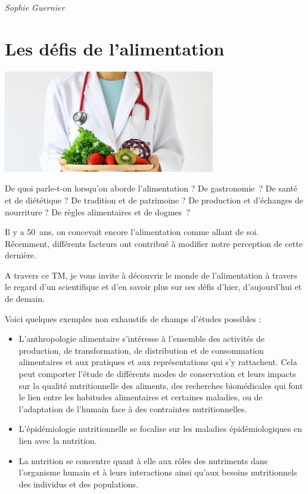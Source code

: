 \documentclass[
  10pt,
  french,
  a5paper,
  openany]{book}
\providecommand{\tightlist}{%
  \setlength{\itemsep}{0pt}\setlength{\parskip}{0pt}}
\newenvironment{signature}{\begin{flushright}}{\end{flushright}}
\begin{document}
\begin{signature}
\emph{Sophie Guernier}

\end{signature}

\hypertarget{les-duxe9fis-de-lalimentation}{%
\chapter{Les défis de l'alimentation}\label{les-duxe9fis-de-lalimentation}}

\begin{center}
\includegraphics[width=\textwidth,height=12em]{images/les-defis-de-lalimentation.png}

\end{center}

De quoi parle-t-on lorsqu'on aborde l'alimentation ? De gastronomie~? De santé et de diététique ? De tradition et de patrimoine ? De production et d'échanges de nourriture ? De règles alimentaires et de dogmes~?

Il y a 50~ans, on concevait encore l'alimentation comme allant de soi. Récemment, différents facteurs ont contribué à modifier notre perception de cette dernière.

A travers ce TM, je vous invite à découvrir le monde de l'alimentation à travers le regard d'un scientifique et d'en savoir plus sur ses défis d'hier, d'aujourd'hui et de demain. ~

Voici quelques exemples non exhaustifs de champs d'études possibles :

\begin{itemize}
\tightlist
\item
  L'anthropologie alimentaire s'intéresse à l'ensemble des activités de production, de transformation, de distribution et de consommation alimentaires et aux pratiques et aux représentations qui s'y rattachent. Cela peut comporter l'étude de différents modes de conservation et leurs impacts sur la qualité nutritionnelle des aliments, des recherches biomédicales qui font le lien entre les habitudes alimentaires et certaines maladies, ou de l'adaptation de l'humain face à des contraintes nutritionnelles.
\item
  L'épidémiologie nutritionnelle se focalise sur les maladies épidémiologiques en lien avec la nutrition.
\item
  La nutrition se concentre quant à elle aux rôles des nutriments dans l'organisme humain et à leurs interactions ainsi qu'aux besoins nutritionnels des individus et des populations.
\end{itemize}
\end{document}
